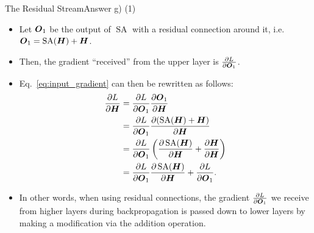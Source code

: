 \documentclass[t]{beamer}
\newcommand\op[1]{\operatorname{#1}}
\begin{document}
\begin{frame}{The Residual Stream}{Answer g) (1)}
    \begin{itemize}
        \item Let ${\boldsymbol{O}}_1$ be the output of $\op{SA}$ with a residual connection
              around it, i.e.\ $\mO_1 = \op{SA}(\mH) + \mH$.
        \item Then, the gradient ``received'' from the upper layer is
              $\frac{\partial L}{\partial {\boldsymbol{O}}_1}$.
        \item Eq.~\ref{eq:input_gradient} can then be rewritten as follows:
              \begin{align*}
                  \frac{\partial L}{\partial \mH} & = \frac{\partial L}{\partial \mO_1}\frac{\partial \mO_1}{\partial \mH}                                                         \\
                                                  & = \frac{\partial L}{\partial \mO_1}\frac{\partial (\op{SA}(\mH) + \mH)}{\partial \mH}                                          \\
                                                  & = \frac{\partial L}{\partial \mO_1}\left(\frac{\partial \op{SA}(\mH)}{\partial \mH} + \frac{\partial \mH}{\partial \mH}\right) \\
                                                  & = \frac{\partial L}{\partial \mO_1}\frac{\partial \op{SA}(\mH)}{\partial \mH} + \frac{\partial L}{\partial \mO_1}.
              \end{align*}
        \item In other words, when using residual connections, the gradient
              $\frac{\partial L}{\partial {\boldsymbol{O}}_1}$ we receive from higher layers
              during backpropagation is passed down to lower layers by making a
              modification via the addition operation.
    \end{itemize}
\end{frame}
\end{document}

